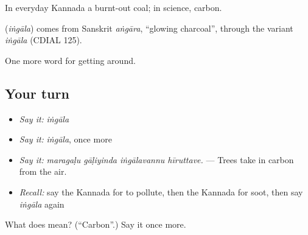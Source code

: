 In everyday Kannada a burnt-out coal; in science, carbon.

\begin{cousinweb}
\textbf{} (\emph{iṅgāla}) comes from Sanskrit \emph{aṅgāra}, \textquotedblleft{}glowing charcoal\textquotedblright{}, through the variant \emph{iṅgāla} (CDIAL 125).
\end{cousinweb}

\begin{grammarlens}[title={What you've built}]
One more word for getting around.
\end{grammarlens}

\subsection*{Your turn}
\begin{itemize}
\raggedright
  \item \emph{Say it:} \emph{iṅgāla}
  \item \emph{Say it:} \emph{iṅgāla}, once more
  \item \emph{Say it:} \emph{maragaḷu gāḷiyinda iṅgālavannu hīruttave.} — Trees take in carbon from the air.
  \item \emph{Recall:} say the Kannada for to pollute, then the Kannada for soot, then say \emph{iṅgāla} again
\end{itemize}

\begin{tcolorbox}[breakable,colback=teal!4,colframe=teal!35!black,title={Before you move on}]
What does  mean? (\textquotedblleft{}Carbon\textquotedblright{}.) Say it once more.
\end{tcolorbox}
